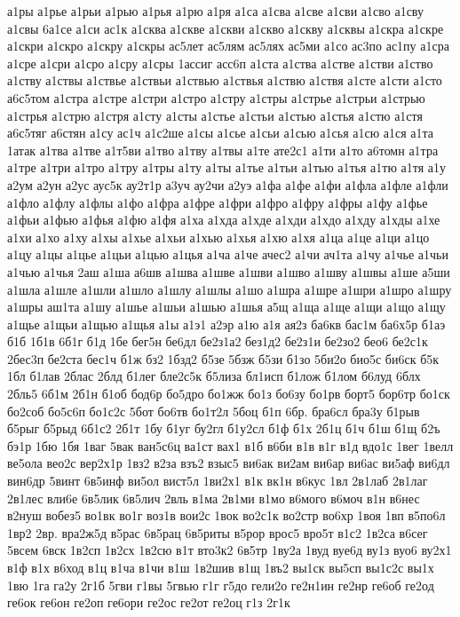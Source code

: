 {а1ры
а1рье
а1рьи
а1рью
а1рья
а1рю
а1ря
а1са
а1сва
а1све
а1сви
а1сво
а1сву
а1свы
6а1се
а1си
ас1к
а1сква
а1скве
а1скви
а1скво
а1скву
а1сквы
а1скра
а1скре
а1скри
а1скро
а1скру
а1скры
ас5лет
ас5лям
ас5лях
ас5ми
а1со
ас3по
ас1пу
а1сра
а1сре
а1сри
а1сро
а1сру
а1сры
1ассиг
асс6п
а1ста
а1ства
а1стве
а1стви
а1ство
а1ству
а1ствы
а1ствье
а1ствьи
а1ствью
а1ствья
а1ствю
а1ствя
а1сте
а1сти
а1сто
а6с5том
а1стра
а1стре
а1стри
а1стро
а1стру
а1стры
а1стрье
а1стрьи
а1стрью
а1стрья
а1стрю
а1стря
а1сту
а1сты
а1стье
а1стьи
а1стью
а1стья
а1стю
а1стя
а6с5тяг
а6стян
а1су
ас1ч
а1с2ше
а1сы
а1сье
а1сьи
а1сью
а1сья
а1сю
а1ся
а1та
1атак
а1тва
а1тве
а1т5ви
а1тво
а1тву
а1твы
а1те
ате2с1
а1ти
а1то
а6томн
а1тра
а1тре
а1три
а1тро
а1тру
а1тры
а1ту
а1ты
а1тье
а1тьи
а1тью
а1тья
а1тю
а1тя
а1у
а2ум
а2ун
а2ус
аус5к
ау2т1р
а3уч
ау2чи
а2уэ
а1фа
а1фе
а1фи
а1фла
а1фле
а1фли
а1фло
а1флу
а1флы
а1фо
а1фра
а1фре
а1фри
а1фро
а1фру
а1фры
а1фу
а1фье
а1фьи
а1фью
а1фья
а1фю
а1фя
а1ха
а1хда
а1хде
а1хди
а1хдо
а1хду
а1хды
а1хе
а1хи
а1хо
а1ху
а1хы
а1хье
а1хьи
а1хью
а1хья
а1хю
а1хя
а1ца
а1це
а1ци
а1цо
а1цу
а1цы
а1цье
а1цьи
а1цью
а1цья
а1ча
а1че
ачес2
а1чи
ач1та
а1чу
а1чье
а1чьи
а1чью
а1чья
2аш
а1ша
а6шв
а1шва
а1шве
а1шви
а1шво
а1шву
а1швы
а1ше
а5ши
а1шла
а1шле
а1шли
а1шло
а1шлу
а1шлы
а1шо
а1шра
а1шре
а1шри
а1шро
а1шру
а1шры
аш1та
а1шу
а1шье
а1шьи
а1шью
а1шья
а5щ
а1ща
а1ще
а1щи
а1що
а1щу
а1щье
а1щьи
а1щью
а1щья
а1ы
а1э1
а2эр
а1ю
а1я
ая2з
ба6кв
бас1м
ба6х5р
б1аэ
б1б
1б1в
6б1г
б1д
1бе
бег5н
бе6дл
бе2з1а2
без1д2
бе2з1и
бе2зо2
бео6
бе2с1к
2бес3п
бе2ста
бес1ч
б1ж
бз2
1бзд2
б5зе
5бзж
б5зи
б1зо
5би2о
био5с
би6ск
б5к
1бл
б1лав
2блас
2блд
б1лег
бле2с5к
б5лиза
бл1исп
б1лож
б1лом
б6луд
6блх
2бль5
6б1м
2б1н
б1об
бод6р
бо5дро
бо1жж
бо1з
бо6зу
бо1рв
борт5
бор6тр
бо1ск
бо2соб
бо5с6п
бо1с2с
5бот
бо6тв
бо1т2л
5боц
б1п
6бр.
бра6сл
бра3у
б1рыв
б5рыг
б5рыд
6б1с2
2б1т
1бу
б1уг
бу2гл
б1у2сл
б1ф
б1х
2б1ц
б1ч
б1ш
б1щ
б2ъ
бэ1р
1бю
1бя
1ваг
5вак
ван5с6ц
ва1ст
вах1
в1б
в6би
в1в
в1г
в1д
вдо1с
1вег
1велл
ве5ола
вео2с
вер2х1р
1вз2
в2за
взъ2
взыс5
ви6ак
ви2ам
ви6ар
ви6ас
ви5аф
ви6дл
вин6др
5винт
6в5инф
ви5ол
вист5л
1ви2х1
в1к
вк1н
в6кус
1вл
2в1лаб
2в1лаг
2в1лес
вли6е
6в5лик
6в5лич
2вль
в1ма
2в1ми
в1мо
в6мого
в6моч
в1н
в6нес
в2нуш
вобез5
во1вк
во1г
воз1в
вои2с
1вок
во2с1к
во2стр
во6хр
1воя
1вп
в5по6л
1вр2
2вр.
вра2ж5д
в5рас
6в5рац
6в5риты
в5рор
врос5
вро5т
в1с2
1в2са
в6сег
5всем
6вск
1в2сп
1в2сх
1в2сю
в1т
вто3к2
6в5тр
1ву2а
1вуд
вуе6д
ву1з
вуо6
ву2х1
в1ф
в1х
в6ход
в1ц
в1ча
в1чи
в1ш
1в2шив
в1щ
1въ2
вы1ск
вы5сп
вы1с2с
вы1х
1вю
1га
га2у
2г1б
5гви
г1вы
5гвью
г1г
г5до
гели2о
ге2н1ин
ге2нр
ге6об
ге2од
ге6ок
ге6он
ге2оп
ге6ори
ге2ос
ге2от
ге2оц
г1з
2г1к
}

